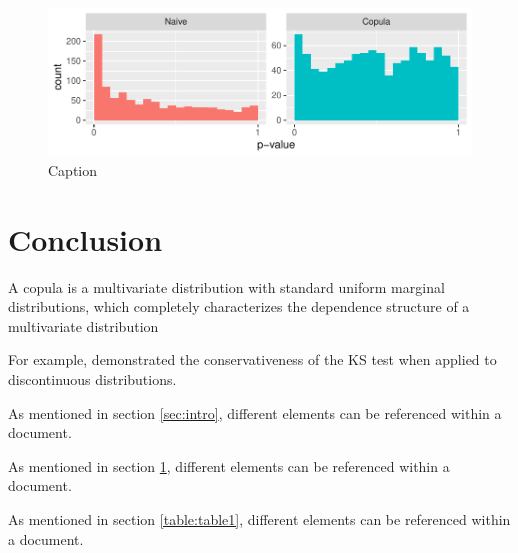 \documentclass[12pt, letterpaper, titlepage]{article}
\begin{document}
\begin{figure}[ht]
  \includegraphics[width=\textwidth]{hist_ar1_D}
  \caption{Caption}
  \label{fig:example}
\end{figure}

\section{Conclusion}
\label{sec:conclusion}

A copula is a
multivariate distribution with standard uniform marginal distributions, which
completely characterizes the dependence structure of a multivariate
distribution \citep{Copula, Hofert}

For example, \citet{Noether} demonstrated the conservativeness of
the KS test when applied to discontinuous distributions.

As mentioned in section \ref{sec:intro}, different elements can be referenced within a document.

As mentioned in section \ref{fig:example}, different elements can be referenced within a document.

As mentioned in section \ref{table:table1}, different elements can be referenced within a document.



\end{document}
